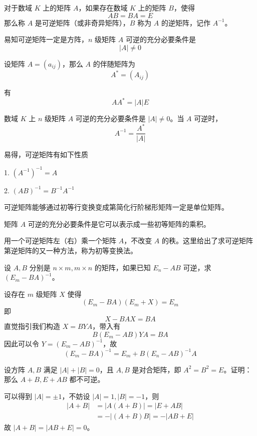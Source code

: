 \begin{definition}
	对于数域 $K$ 上的矩阵 $A$，如果存在数域 $K$ 上的矩阵 $B$，使得
	\[AB = BA = E\]
	那么称 $A$ 是可逆矩阵（或非奇异矩阵），$B$ 称为 $A$ 的逆矩阵，记作 $A^{-1}$。
\end{definition}

易知可逆矩阵一定是方阵，$n$ 级矩阵 $A$ 可逆的充分必要条件是
\[|A| \ne 0\]

\begin{definition}
	设矩阵 $A = (a_{ij})$，那么 $A$ 的伴随矩阵为
	\[A^*=(A_{ij})\]
\end{definition}

有
\[AA^* = |A|E\]

\begin{theorem}
	数域 $K$ 上 $n$ 级矩阵 $A$ 可逆的充分必要条件是 $|A| \ne 0$。当 $A$ 可逆时，
	\[A^{-1} = \frac{A^*}{|A|}\]
\end{theorem}

易得，可逆矩阵有如下性质

1. $(A^{-1})^{-1} = A$

2. $(AB)^{-1} = B^{-1}A^{-1}$

可逆矩阵能够通过初等行变换变成第简化行阶梯形矩阵一定是单位矩阵。

\begin{theorem}
	矩阵 $A$ 可逆的充分必要条件是它可以表示成一些初等矩阵的乘积。
\end{theorem}

用一个可逆矩阵左（右）乘一个矩阵 $A$，不改变 $A$ 的秩。这里给出了求可逆矩阵第逆矩阵的又一种方法，称为初等变换法。

\begin{example}
	设 $A, B$ 分别是 $n \times m, m \times n$ 的矩阵，如果已知 $E_n - AB$ 可逆，求 $(E_m - BA)^{-1}$。
\end{example}

\begin{solution}
	设存在 $m$ 级矩阵 $X$ 使得
	\[ (E_m - BA)(E_m + X) = E_m \]
	即
	\[ X - BAX = BA \]
	直觉指引我们构造 $X = BYA$，带入有
	\[ B(E_m - AB)YA = BA \]
	因此可以令 $Y = (E_m - AB)^{-1}$，故
	\[ (E_m - BA)^{-1} = E_m + B(E_n - AB)^{-1}A \]
\end{solution}

\begin{example}
	设方阵 $A, B$ 满足 $|A| + |B| = 0$，且 $A, B$ 是对合矩阵，即 $A^2 = B^2 = E$。证明：那么 $A+B, E + AB$ 都不可逆。
\end{example}

\begin{solution}
	可以得到 $|A| = \pm 1$，不妨设 $|A| = 1, |B| = -1$，则
	\[ \begin{aligned}
			|A + B| & = |A(A+B)| = |E+AB|    \\
			        & = -|(A+B)B| = -|AB+E|
		\end{aligned} \]
	故 $|A+B| = |AB+E| = 0$。
\end{solution}

